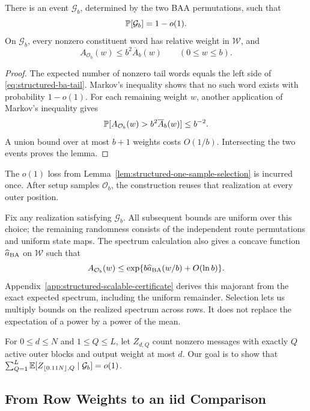 \begin{lemma}
\label{lem:structured-one-sample-selection}
There is an event $\mathcal G_b$, determined by the two BAA permutations, such
that
\begin{equation}
  \mathbb P[\mathcal G_b]=1-o(1).
  \label{eq:ba-good-event}
\end{equation}
On $\mathcal G_b$, every nonzero constituent word has relative weight in
$\mathcal W$, and
\begin{equation}
  A_{\mathcal O_b}(w)
  \le b^2\overline A_b(w)
  \qquad(0\le w\le b).
  \label{eq:ba-selected-spectrum}
\end{equation}
\end{lemma}

\begin{proof}
The expected number of nonzero tail words equals the left side of
\eqref{eq:structured-ba-tail}. Markov's inequality shows that no such word
exists with probability $1-o(1)$. For each remaining weight $w$, another
application of Markov's inequality gives
\[
  \mathbb P[A_{\mathcal O_b}(w)>b^2\overline A_b(w)]\le b^{-2}.
\]
A union bound over at most $b+1$ weights costs $O(1/b)$. Intersecting the two
events proves the lemma.
\end{proof}

The $o(1)$ loss from Lemma~\ref{lem:structured-one-sample-selection} is
incurred once.
After setup samples $\mathcal O_b$, the construction reuses that realization
at every outer position.

Fix any realization satisfying $\mathcal G_b$. All subsequent bounds are
uniform over this choice; the remaining randomness consists of the
independent route permutations and uniform state maps.
The spectrum calculation also gives a concave function
$\widehat a_{\rm BA}$ on $\mathcal W$ such that
\[
 A_{\mathcal O_b}(w)
 \le \exp\{b\widehat a_{\rm BA}(w/b)+O(\ln b)\}.
\]
Appendix~\ref{app:structured-scalable-certificate} derives this majorant
from the exact expected spectrum, including the uniform remainder.
Selection lets us multiply bounds on the realized spectrum across rows.
It does not replace the expectation of a power by a power of the mean.

For $0\le d\le N$ and $1\le Q\le L$, let $Z_{d,Q}$ count nonzero messages
with exactly $Q$ active outer blocks and output weight at most $d$.
Our goal is to show that
$\sum_{Q=1}^L\mathbb E[Z_{\lfloor0.11N\rfloor,Q}\mid\mathcal G_b]=o(1)$.

\subsection{From Row Weights to an iid Comparison}

